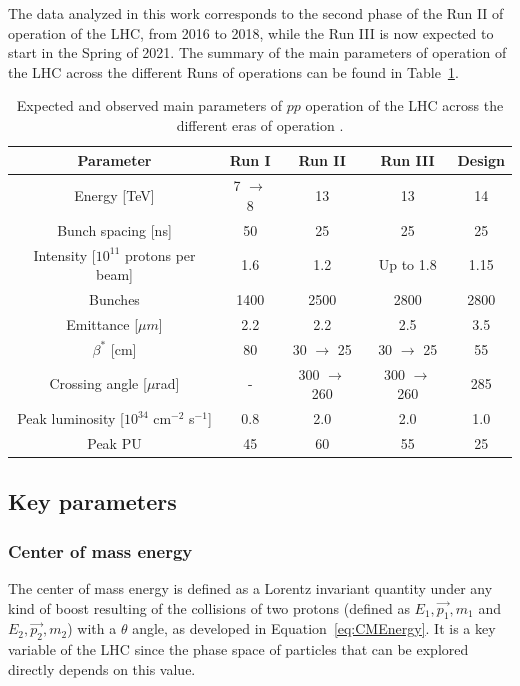 \documentclass[a4paper, 10pt, openright]{report}
\begin{document}
The data analyzed in this work corresponds to the second phase of the Run II of operation of the \ac{LHC}, from 2016 to 2018, while the Run III is now expected to start in the Spring of 2021. The summary of the main parameters of operation of the \ac{LHC} across the different Runs of operations can be found in Table~\ref{table:LHCRuns}.

\begin{table}
\begin{center}
\begin{tabular}{ c|c|c|c|c } 
 \hline
 Parameter & Run I & Run II & Run III & Design \\
\hline
Energy [TeV] & 7 $\rightarrow$ 8 & 13 & 13 & 14 \\
Bunch spacing [ns] & 50 & 25 & 25 & 25 \\
Intensity [$10^{11}$ protons per beam] & 1.6 & 1.2 & Up to 1.8 & 1.15 \\
Bunches & 1400 & 2500 & 2800 & 2800 \\
Emittance [$\mu m$] & 2.2 & 2.2 & 2.5 & 3.5 \\
$\beta^*$ [cm] & 80 & 30 $\rightarrow$ 25 & 30 $\rightarrow$ 25 & 55 \\
Crossing angle [$\mu$rad] & - & 300 $\rightarrow$ 260 & 300 $\rightarrow$ 260 & 285 \\
Peak luminosity [$10^{34}$ cm$^{-2}$ s$^{-1}$] & 0.8 & 2.0 & 2.0 & 1.0 \\
Peak \ac{PU} & 45 & 60 & 55 & 25 \\
 \hline
\end{tabular}
\caption{ Expected and observed main parameters of $pp$ operation of the \ac{LHC} across the different eras of operation \cite{LHCRuns}.}
\label{table:LHCRuns}
\end{center}
\end{table}

\subsection{Key parameters}\label{section:LHCParams}

\subsubsection{Center of mass energy} \label{subsection:CMEnergy}

The center of mass energy is defined as a Lorentz invariant quantity under any kind of boost resulting of the collisions of two protons (defined as $E_1, \overrightarrow{p_1}, m_1$ and $E_2, \overrightarrow{p_2}, m_2$) with a $\theta$ angle, as developed in Equation~\ref{eq:CMEnergy}. It is a key variable of the \ac{LHC} since the phase space of particles that can be explored directly depends on this value.
\end{document}
